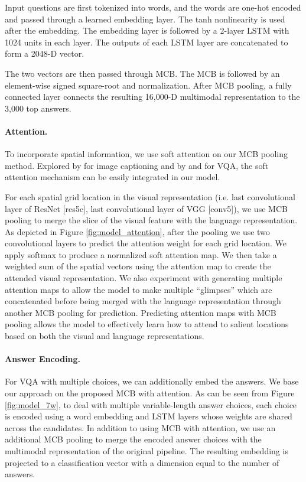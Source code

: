 \documentclass[11pt,letterpaper]{article}
\newcommand{\myparagraph}[1]{\paragraph{#1}}
\begin{document}
Input questions are first tokenized into words, and the words are one-hot encoded and passed through a learned embedding layer. The tanh nonlinearity is used after the embedding. The embedding layer is followed by a 2-layer LSTM with 1024 units in each layer. The outputs of each LSTM layer are concatenated to form a 2048-D vector.

The two vectors are then passed through MCB. The MCB is followed by an element-wise signed square-root and  normalization. After MCB pooling, a fully connected layer connects the resulting 16,000-D multimodal representation to the 3,000 top answers.

\myparagraph{Attention.}
\label{sec:architecture:att}
To incorporate spatial information, we use soft attention on our MCB pooling method.  Explored by \cite{xu15icml} for image captioning and by \cite{xu2015ask} and \cite{yang2015stacked} for VQA, the soft attention mechanism can be easily integrated in our model.

For each spatial grid location in the visual representation (i.e. last convolutional layer of ResNet [res5c], last convolutional layer of VGG [conv5]), we use MCB pooling to merge the slice of the visual feature with the language representation. As depicted in Figure \ref{fig:model_attention}, after the pooling we use two convolutional layers to predict the attention weight for each grid location. We apply softmax to produce a normalized soft attention map.
We then take a weighted sum of the spatial vectors using the attention map to create the attended  visual representation. We also experiment with generating multiple attention maps to allow the model to make multiple ``glimpses'' which are concatenated before being merged with the language representation through another MCB pooling for prediction. Predicting attention maps with MCB pooling allows the model to effectively learn how to attend to salient locations based on both the visual and language representations. 

\myparagraph{Answer Encoding.}
\label{sec:architecture:visual7w}
For VQA with multiple choices, we can additionally embed the answers. We base our approach on the proposed MCB with attention. As can be seen from Figure \ref{fig:model_7w}, to deal with multiple variable-length answer choices, each choice is encoded using a word embedding and LSTM layers whose weights are shared across the candidates. In addition to using MCB with attention, we use an additional MCB pooling to merge the encoded answer choices with the multimodal representation of the original pipeline. The resulting embedding is projected to a classification vector with a dimension equal to the number of answers. 
\end{document}
